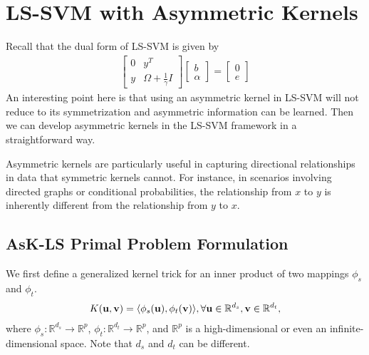 \section{LS-SVM with Asymmetric Kernels}
\label{sec:asymmetric_kernels}

Recall that the dual form of LS-SVM is given by
\begin{align*}
	\begin{bmatrix}
	0 & y^T \\
	y & \Omega + \frac{1}{\gamma} I
	\end{bmatrix}
	\begin{bmatrix}
	b \\
	\alpha
	\end{bmatrix}
	=
	\begin{bmatrix}
	0 \\
	e \end{bmatrix}
\end{align*}
An interesting point here is that using an asymmetric kernel in LS-SVM will not reduce to its symmetrization and asymmetric information can be learned. Then we can develop asymmetric kernels in the LS-SVM framework in a straightforward way.

Asymmetric kernels are particularly useful in capturing directional relationships in data that symmetric kernels cannot. For instance, in scenarios involving directed graphs or conditional probabilities, the relationship from $x$ to $y$ is inherently different from the relationship from $y$ to $x$.

\subsection{AsK-LS Primal Problem Formulation}
We first define a generalized kernel trick for an inner product of two mappings $\phi_s$ and $\phi_t$.
\begin{align*}
	K({\mathbf{u}}, {\mathbf{v}}) = \langle \phi_s({\mathbf{u}}), \phi_t({\mathbf{v}})\rangle, \forall {\mathbf{u}} \in \mathbb{R}^{d_s}, {\mathbf{v}} \in \mathbb{R}^{d_t},
\end{align*}
where $\phi_s: \mathbb{R}^{d_s}\to \mathbb{R}^{p}$, $\phi_t: \mathbb{R}^{d_t}\to \mathbb{R}^{p}$, and $\mathbb{R}^p$ is a high-dimensional or even an infinite-dimensional space. Note that $d_s$ and $d_t$ can be different. 

